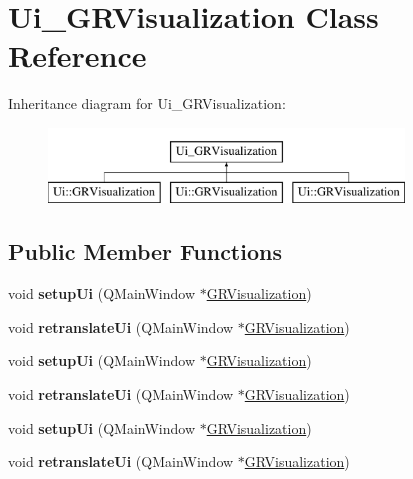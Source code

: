 \hypertarget{classUi__GRVisualization}{}\section{Ui\+\_\+\+G\+R\+Visualization Class Reference}
\label{classUi__GRVisualization}
Inheritance diagram for Ui\+\_\+\+G\+R\+Visualization\+:\begin{figure}[H]
\begin{center}
\leavevmode
\includegraphics[height=2.000000cm]{classUi__GRVisualization}
\end{center}
\end{figure}
\subsection*{Public Member Functions}
\begin{DoxyCompactItemize}
\item 
\mbox{\label{classUi__GRVisualization_a42b12add8eb82f8571ec6e58dca7eacc}} 
void {\bfseries setup\+Ui} (Q\+Main\+Window $\ast$\mbox{\hyperlink{classGRVisualization}{G\+R\+Visualization}})
\item 
\mbox{\label{classUi__GRVisualization_a9d5c1227525cd5fe0c78c02bde53ae14}} 
void {\bfseries retranslate\+Ui} (Q\+Main\+Window $\ast$\mbox{\hyperlink{classGRVisualization}{G\+R\+Visualization}})
\item 
\mbox{\label{classUi__GRVisualization_a42b12add8eb82f8571ec6e58dca7eacc}} 
void {\bfseries setup\+Ui} (Q\+Main\+Window $\ast$\mbox{\hyperlink{classGRVisualization}{G\+R\+Visualization}})
\item 
\mbox{\label{classUi__GRVisualization_a9d5c1227525cd5fe0c78c02bde53ae14}} 
void {\bfseries retranslate\+Ui} (Q\+Main\+Window $\ast$\mbox{\hyperlink{classGRVisualization}{G\+R\+Visualization}})
\item 
\mbox{\label{classUi__GRVisualization_a42b12add8eb82f8571ec6e58dca7eacc}} 
void {\bfseries setup\+Ui} (Q\+Main\+Window $\ast$\mbox{\hyperlink{classGRVisualization}{G\+R\+Visualization}})
\item 
\mbox{\label{classUi__GRVisualization_a9d5c1227525cd5fe0c78c02bde53ae14}} 
void {\bfseries retranslate\+Ui} (Q\+Main\+Window $\ast$\mbox{\hyperlink{classGRVisualization}{G\+R\+Visualization}})
\end{DoxyCompactItemize}
